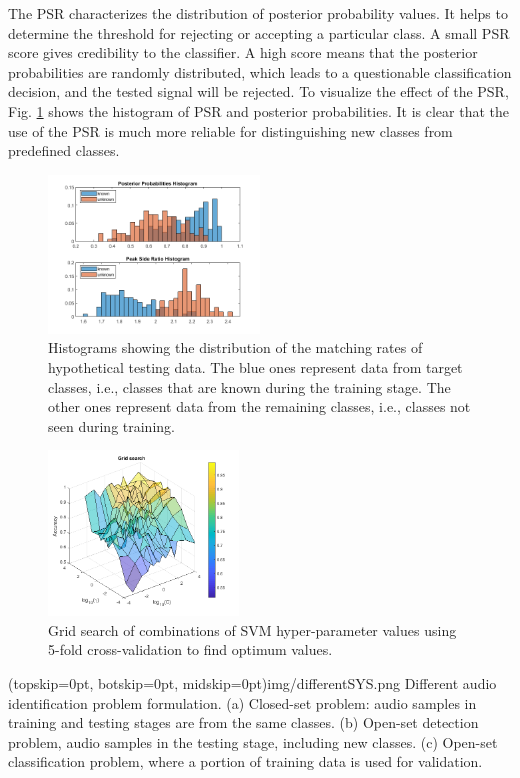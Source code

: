 \documentclass{ieeeaccess}
\begin{document}
The PSR characterizes the distribution of posterior probability values. It helps to determine the threshold for rejecting or accepting a particular class. A small PSR score gives credibility to the classifier. A high score means that the posterior probabilities are randomly distributed, which leads to a questionable classification decision, and the tested signal will be rejected. To visualize the effect of the PSR, Fig. \ref{fig:fig3} shows the histogram of PSR and posterior probabilities. It is clear that the use of the PSR is much more reliable for distinguishing new classes from predefined classes.
\begin{figure}[t!]
	\centering
	\includegraphics[width=0.5\textwidth]{img/histogram.png}
	\caption{Histograms showing the distribution of the matching rates of hypothetical testing data. The blue ones represent data from target classes, i.e., classes that are known during the training stage. The other ones represent data from the remaining classes, i.e., classes not seen during training.  }
	\label{fig:fig3}
\end{figure}
\begin{figure}[t!]
	\centering
	\includegraphics[width=0.45\textwidth]{img/grid.png}
	\caption{Grid search of combinations of SVM hyper-parameter values using 5-fold cross-validation to find optimum values.}
	\label{fig:fig4}
\end{figure} 


\Figure[t!]
(topskip=0pt, botskip=0pt, midskip=0pt){img/differentSYS.png}
{Different audio identification problem formulation. (a) Closed-set problem: audio samples in training and testing stages are from the same classes. (b) Open-set detection problem, audio samples in the testing stage, including new classes. (c) Open-set classification problem, where a portion of training data is used for validation.\label{fig:fig5}}
\end{document}
